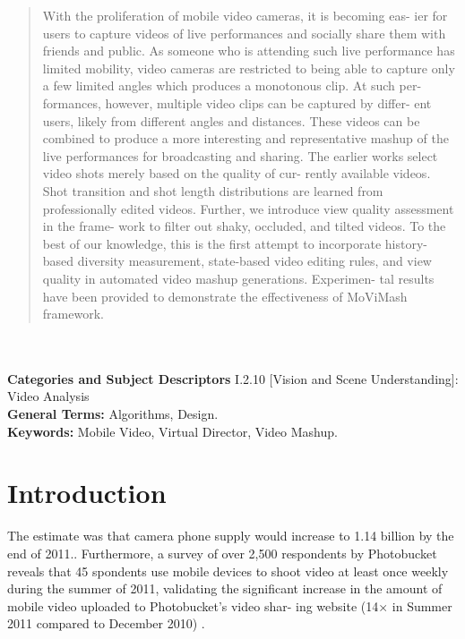 \documentclass{sig-alternate}
\begin{document}
\maketitle
\begin{abstract}
With the proliferation of mobile video cameras, it is becoming eas-
ier for users to capture videos of live performances and socially
share them with friends and public. As someone who is attending such live performance has limited mobility, video cameras are restricted to being able to capture only a few limited angles which produces a monotonous clip. At such per-
formances, however, multiple video clips can be captured by differ-
ent users, likely from different angles and distances. These videos
can be combined to produce a more interesting and representative
mashup of the live performances for broadcasting and sharing. The
earlier works select video shots merely based on the quality of cur-
rently available videos. Shot transition
and shot length distributions are learned from professionally edited
videos. Further, we introduce view quality assessment in the frame-
work to filter out shaky, occluded, and tilted videos. To the best
of our knowledge, this is the first attempt to incorporate history-
based diversity measurement, state-based video editing rules, and
view quality in automated video mashup generations. Experimen-
tal results have been provided to demonstrate the effectiveness of
MoViMash framework.
\end{abstract}\\\\
\textbf{Categories and Subject Descriptors}
I.2.10 [Vision and Scene Understanding]: Video Analysis\\
\textbf{General Terms:} Algorithms, Design.\\
\textbf{Keywords: }Mobile Video, Virtual Director, Video Mashup.
\section{Introduction}
The estimate was that camera phone supply would increase to 1.14 billion by the end of 2011.\cite{1}. Furthermore, a survey of
over 2,500 respondents by Photobucket reveals that 45%
spondents use mobile devices to shoot video at least once weekly during the summer of 2011, validating the significant increase in
the amount of mobile video uploaded to Photobucket’s video shar-
ing website (14× in Summer 2011 compared to December 2010) \cite{2}.
\end{document}
